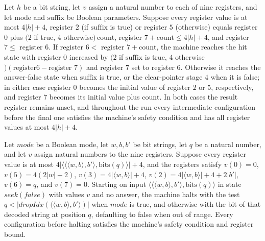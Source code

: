 \begin{lemma}
\label{Complexity.drop_seek_run}
\leanok
{}
Let $h$ be a bit string, let $v$ assign a natural number to each of nine registers, and
let $\mathrm{mode}$ and $\mathrm{suffix}$ be Boolean parameters. Suppose every register
value is at most $4|h|+4$, register $2$ (if $\mathrm{suffix}$ is true) or register $5$
(otherwise) equals register $0$ plus $(2$ if true, $4$ otherwise$)\,\mathrm{count}$,
register $7+\mathrm{count}\le 4|h|+4$, and register $7\le$ register $6$. If register
$6<$ register $7+\mathrm{count}$, the machine reaches the hit state with register $0$
increased by $(2$ if $\mathrm{suffix}$ is true, $4$ otherwise$)(\text{register
}6-\text{register }7)$ and register $7$ set to register $6$. Otherwise it reaches the
answer-false state when $\mathrm{suffix}$ is true, or the clear-pointer stage $4$ when
it is false; in either case register $0$ becomes the initial value of register $2$ or
$5$, respectively, and register $7$ becomes its initial value plus $\mathrm{count}$. In
both cases the result register remains unset, and throughout the run every intermediate
configuration before the final one satisfies the machine's safety condition and has all
register values at most $4|h|+4$.
\end{lemma}

\begin{lemma}
\label{Complexity.drop_lookup}
\leanok
{}
Let $mode$ be a Boolean mode, let $w,b,b'$ be bit strings, let $q$ be a natural number,
and let $v$ assign natural numbers to the nine registers. Suppose every register value
is at most $4|\langle\langle\langle w,b\rangle,b'\rangle,\mathrm{bits}(q)\rangle|+4$,
and the registers satisfy $v(0)=0$, $v(5)=4(2|w|+2)$, $v(3)=4|\langle w,b\rangle|+4$,
$v(2)=4|\langle w,b\rangle|+4+2|b'|$, $v(6)=q$, and $v(7)=0$. Starting on input
$\langle\langle\langle w,b\rangle,b'\rangle,\mathrm{bits}(q)\rangle$ in state
$seek(false)$ with values $v$ and no answer, the machine halts with the test
$q<|dropIdx(\langle\langle w,b\rangle,b'\rangle)|$ when $mode$ is true, and otherwise
with the bit of that decoded string at position $q$, defaulting to false when out of
range. Every configuration before halting satisfies the machine's safety condition and
register bound.
\end{lemma}

